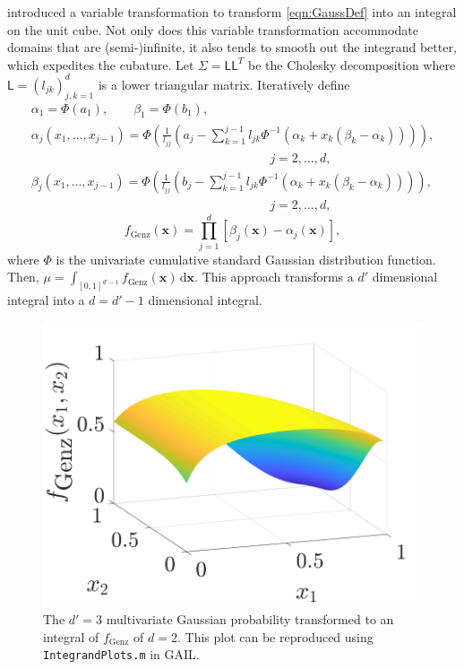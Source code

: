 \documentclass{svjour3}                     %
\newcommand{\bm}[1]{\boldsymbol{#1}}
\newcommand{\mSigma}{\mathsf{\Sigma}}
\newcommand{\dif}[1]{\text{d}{#1}}
\newcommand{\vx}{\bm{x}}
\newcommand{\dvx}{\dif{\bm{x}}}
\newcommand{\mL}{\mathsf{L}}
\newcommand{\code}[1]{\texttt{#1}}
\begin{document}
\cite{Gen93} introduced a variable transformation to transform \eqref{eqn:GaussDef} into an integral on the unit cube.  Not only does this variable transformation accommodate domains that are (semi-)infinite, it also tends to smooth out the integrand better, which expedites the cubature.  Let $\mSigma= \mL \mL^T$ be the Cholesky decomposition where $\mL = (l_{jk})_{j,k=1}^d$ is a lower triangular matrix.  Iteratively define
\allowdisplaybreaks
\begin{gather*}
\alpha_1 = \Phi(a_1), \qquad \beta_1 = \Phi(b_1),
\\
\alpha_j(x_1,\dots,x_{j-1}) = 
\Phi
\left(
\frac{1}{l_{jj}} 
\left(
a_j - \sum_{k=1}^{j-1} l_{jk} \Phi^{-1}(\alpha_k + x_k(\beta_k-\alpha_k))
\right)
\right), 
\\
\hspace{8cm} j=2,\dots,d,
\\
\beta_j(x_1,\dots,x_{j-1}) = 
\Phi
\left(
\frac{1}{l_{jj}} 
\left(
b_j - \sum_{k=1}^{j-1} l_{jk} \Phi^{-1}(\alpha_k + x_k(\beta_k-\alpha_k))
\right)
\right), 
\\
\hspace{8cm} j=2,\dots,d,
\end{gather*}
\begin{equation}
\label{fGenzdef}
f_{\text{Genz}}(\vx) = \prod_{j=1}^d [\beta_j(\vx) - \alpha_j(\vx)],
\end{equation}
where $\Phi$ is the univariate cumulative standard Gaussian distribution function.  Then, $\mu = \int_{[0,1]^{d'-1}} f_{\text{Genz}}(\vx) \, \dvx$. This approach transforms a $d'$ dimensional integral into a $d=d'-1$ dimensional integral.

\begin{figure}
	\captionsetup[subfigure]{labelformat=empty}
	\centering
		\includegraphics[width=0.7\linewidth]{GenzFunc_varTx_none}
	\caption{The $d'=3$ multivariate Gaussian probability transformed to an integral of $f_{\text{Genz}}$ of $d=2$. This plot can be reproduced using \code{IntegrandPlots.m} in GAIL.}
	\label{fig:MVN_Genz}
\end{figure}
\end{document}
